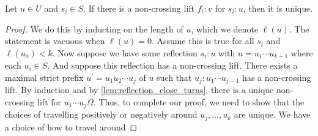 \begin{theorem}
	Let $u \in U$ and $s_i \in S$.
	If there is a non-crossing lift $f_i : v$ for $s_i : u$, then it is unique.
\end{theorem}
\begin{proof}
	We do this by inducting on the length of $u$, which we denote $\ell(u)$.
	The statement is vacuous when $\ell(u) = 0$.
	Assume this is true for all $s_i$ and $\ell(u_0) < k$.
	Now suppose we have some reflection $s_i : u$ with $u = u_1\cdots u_{k+1}$ where each $u_i \in S$.
	And suppose this reflection has a non-crossing lift.
	There exists a maximal strict prefix $u^\prime = u_1u_2\cdots u_j$ of  $u$ such that  $u_j : u_1\cdots u_{j-1}$ has a non-crossing lift.
	By induction and by \cref{lem:reflection_close_turns}, there is a unique non-crossing lift for $u_1\cdots u_j \Omega$.
	Thus, to complete our proof, we need to show that the choices of travelling positively or negatively around $u_{j},\ldots,u_k$ are unique.
	We have a choice of how to travel around
\end{proof}


